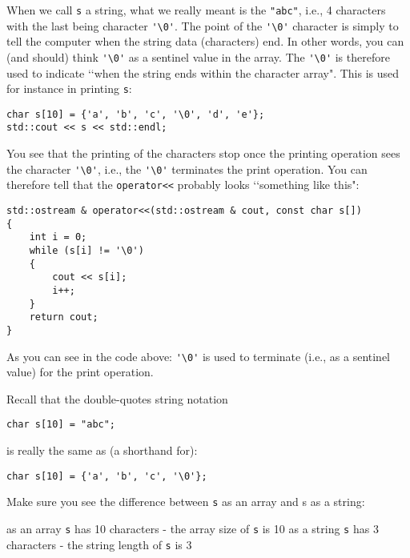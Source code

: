 When we call \verb!s! a string, what we really meant is the \verb!"abc"!,
i.e., 4 characters with the last being character \verb!'\0'!.
The point of the \verb!'\0'! character is simply to
tell the computer when the string data (characters) end.
In other words, you can (and should) think \verb!'\0'! as
a sentinel value in the array.
The \verb!'\0'! is therefore used to indicate
\lq\lq when the string ends within the character array".
This is used for instance in printing \verb!s!:
{\small
\begin{Verbatim}[frame=single, commandchars = \~\@\!]
char s[10] = {'a', 'b', 'c', '\0', 'd', 'e'};
std::cout << s << std::endl;
\end{Verbatim}
}
You see that the printing of the characters stop once the
printing operation sees the character \verb!'\0'!, i.e.,
the \verb!'\0'! terminates the print operation. You can therefore tell
that the \verb!operator<<! probably looks
\lq\lq something like this":
{\small
\begin{Verbatim}[frame=single, commandchars = \~\@\$]
std::ostream & operator<<(std::ostream & cout, const char s[])
{
    int i = 0;
    while (s[i] != '\0')
    {
        cout << s[i];
        i++;
    }
    return cout;
}
\end{Verbatim}
}
As you can see in the code above: \verb!'\0'! is used to terminate
(i.e., as a sentinel value) for the print operation.

Recall that the double-quotes string notation
{\small
\begin{Verbatim}[frame=single, commandchars = \~\@\!]
char s[10] = "abc";
\end{Verbatim}
}
is really the same as (a shorthand for):
{\small
\begin{Verbatim}[frame=single, commandchars = \~\@\!]
char s[10] = {'a', 'b', 'c', '\0'};
\end{Verbatim}
}
Make sure you see the difference between \verb!s! as an array and s as a string:
\begin{tightlist}
 \li as an array \verb!s! has 10 characters - the array size of \verb!s! is 10
 \li as a string \verb!s! has 3 characters - the string length of \verb!s! is 3
\end{tightlist}

